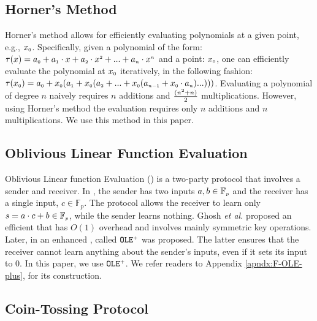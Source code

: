 \vs
\vs

\subsection{Horner's Method}
Horner's method \cite{DBLP:journals/ibmrd/Dorn62} allows for efficiently evaluating polynomials at a given point, e.g., $x_{\scriptscriptstyle 0}$. Specifically, given a polynomial of the form: $\tau(x)= a_{\scriptscriptstyle 0}+a_{\scriptscriptstyle 1}\cdot x+a_{\scriptscriptstyle 2}\cdot x^{\scriptscriptstyle 2}+...+a_{\scriptscriptstyle n}\cdot x^{\scriptscriptstyle n}$ and a point: $x_{\scriptscriptstyle 0}$, one can efficiently evaluate the polynomial at $x_{\scriptscriptstyle 0}$ iteratively, in the following fashion: $\tau(x_{\scriptscriptstyle 0})=a_{\scriptscriptstyle 0}+x_{\scriptscriptstyle 0}(a_{\scriptscriptstyle 1} + x_{\scriptscriptstyle 0}(a_{\scriptscriptstyle 2}+...+x_{\scriptscriptstyle 0}(a_{\scriptscriptstyle n-1}+x_{\scriptscriptstyle 0}\cdot a_{\scriptscriptstyle n})...)))$. Evaluating  a polynomial of degree $n$ naively requires  $n$ additions and $\frac{(n^{\scriptscriptstyle 2}+n)}{2}$ multiplications. However, using Horner's method the evaluation requires only $n$ additions and $n$ multiplications. We use this method in this paper. 

\vs
\vs

\subsection{Oblivious Linear Function Evaluation}\label{sec::OLE-plus}

Oblivious Linear function Evaluation (\ole) is a two-party protocol that involves a sender and receiver. In \ole,  the sender  has two  inputs  $a, b\in \mathbb{F}_{\scriptscriptstyle p}$ and the receiver has a single input, $c \in \mathbb{F}_{p}$.  The protocol allows the receiver to learn only $s = a\cdot c + b \in \mathbb{F}_{\scriptscriptstyle p}$, while the sender learns nothing. Ghosh \textit{et al.} \cite{GhoshNN17} proposed an efficient \ole that has $O(1)$ overhead and involves mainly symmetric key operations. Later, in \cite{GhoshN19} an enhanced \ole, called $\mathtt{OLE}^{\scriptscriptstyle +}$ was proposed. The latter ensures that the receiver cannot learn anything about the sender's inputs,  even if it sets its input to $0$. In this paper, we use $\mathtt{OLE}^{\scriptscriptstyle +}$. We refer readers to Appendix \ref{apndx:F-OLE-plus}, for its construction.  %


\vs
\vs
\subsection{Coin-Tossing Protocol}

